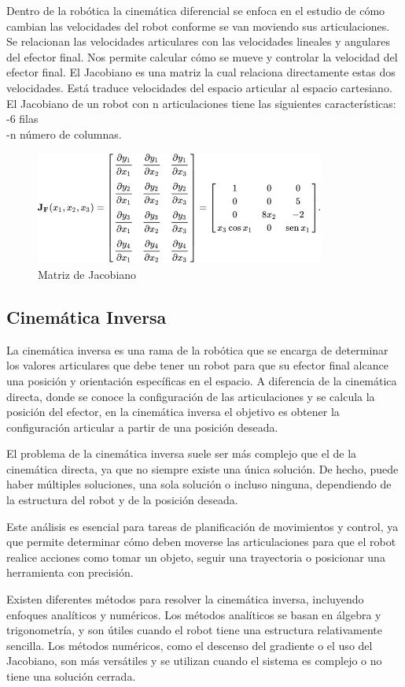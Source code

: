 Dentro de la robótica la cinemática diferencial se enfoca en el estudio de cómo cambian las velocidades del robot conforme se van moviendo sus articulaciones. Se relacionan las velocidades articulares con las velocidades lineales y angulares del efector final. Nos permite calcular cómo se mueve y controlar la velocidad del efector final. 
El Jacobiano es una matriz la cual relaciona directamente estas dos velocidades. Está traduce velocidades del espacio articular al espacio cartesiano. El Jacobiano de un robot con n articulaciones tiene las siguientes características:
  \\
-6 filas \\
-n número de columnas.\\

\begin{figure}[h]
	\centering
	\includegraphics[width=0.5\linewidth]{img/jacobiano}
	\caption{Matriz de Jacobiano}
	\label{fig:jacobiano}
\end{figure}

\subsection{Cinemática Inversa}

La cinemática inversa es una rama de la robótica que se encarga de determinar los valores articulares que debe tener un robot para que su efector final alcance una posición y orientación específicas en el espacio. A diferencia de la cinemática directa, donde se conoce la configuración de las articulaciones y se calcula la posición del efector, en la cinemática inversa el objetivo es obtener la configuración articular a partir de una posición deseada.

El problema de la cinemática inversa suele ser más complejo que el de la cinemática directa, ya que no siempre existe una única solución. De hecho, puede haber múltiples soluciones, una sola solución o incluso ninguna, dependiendo de la estructura del robot y de la posición deseada.

Este análisis es esencial para tareas de planificación de movimientos y control, ya que permite determinar cómo deben moverse las articulaciones para que el robot realice acciones como tomar un objeto, seguir una trayectoria o posicionar una herramienta con precisión.

Existen diferentes métodos para resolver la cinemática inversa, incluyendo enfoques analíticos y numéricos. Los métodos analíticos se basan en álgebra y trigonometría, y son útiles cuando el robot tiene una estructura relativamente sencilla. Los métodos numéricos, como el descenso del gradiente o el uso del Jacobiano, son más versátiles y se utilizan cuando el sistema es complejo o no tiene una solución cerrada.
